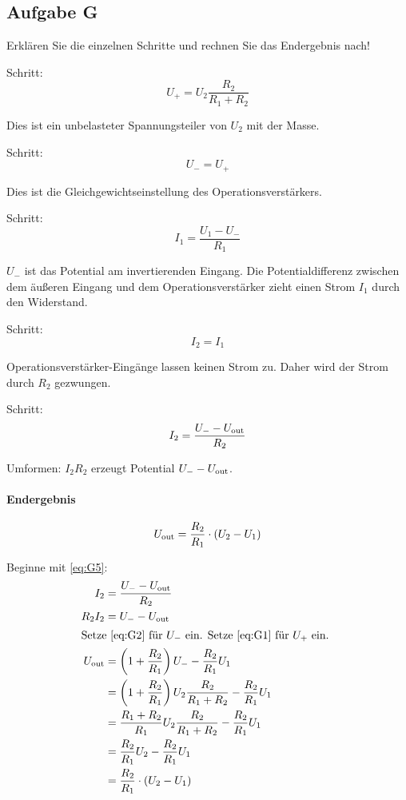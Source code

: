 \subsection{Aufgabe G}

\begin{problem}
	Erklären Sie die einzelnen Schritte und rechnen Sie das Endergebnis nach!
\end{problem}

Schritt:
\begin{equation}
	\label{eq:G1}
	U_+ = U_2 \frac{R_2}{R_1 + R_2}
\end{equation}

Dies ist ein unbelasteter Spannungsteiler von $U_2$ mit der Masse.

Schritt:
\begin{equation}
	\label{eq:G2}
	U_- = U_+
\end{equation}

Dies ist die Gleichgewichtseinstellung des Operationsverstärkers.

Schritt:
\begin{equation}
	\label{eq:G3}
	I_1 = \frac{U_1 - U_-}{R_1}
\end{equation}

$U_-$ ist das Potential am invertierenden Eingang. Die Potentialdifferenz
zwischen dem äußeren Eingang und dem Operationsverstärker zieht einen Strom
$I_1$ durch den Widerstand.

Schritt:
\begin{equation}
	\label{eq:G4}
	I_2 = I_1
\end{equation}

Operationsverstärker-Eingänge lassen keinen Strom zu. Daher wird der Strom
durch $R_2$ gezwungen.

Schritt:
\begin{equation}
	\label{eq:G5}
	I_2 = \frac{U_- - U_\text{out}}{R_2}
\end{equation}

Umformen: $I_2 R_2$ erzeugt Potential $U_- - U_\text{out}$.

\paragraph{Endergebnis}
\[
	U_\text{out} = \frac{R_2}{R_1} \cdot (U_2 - U_1)
\]

Beginne mit \eqref{eq:G5}:
\begin{align*}
	I_2 &= \frac{U_- - \Uout}{R_2} \\
	R_2 I_2 &= U_- - \Uout \\
	\intertext{%
		Setze \eqref{eq:G2} für $U_-$ ein. Setze \eqref{eq:G1} für $U_+$ ein.
	}
	\Uout
	&= \del{1 + \frac{R_2}{R_1}} U_- - \frac{R_2}{R_1} U_1 \\
	&= \del{1 + \frac{R_2}{R_1}} U_2 \frac{R_2}{R_1 + R_2} - \frac{R_2}{R_1} U_1 \\
	&= \frac{R_1 + R_2}{R_1} U_2 \frac{R_2}{R_1 + R_2} - \frac{R_2}{R_1} U_1 \\
	&= \frac{R_2}{R_1} U_2 - \frac{R_2}{R_1} U_1 \\
	&= \frac{R_2}{R_1} \cdot (U_2 - U_1)
\end{align*}

